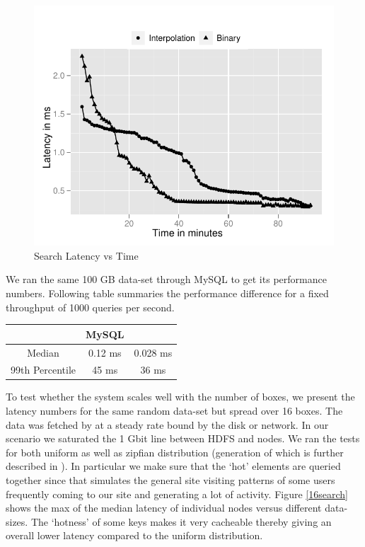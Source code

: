 \begin{figure}
  \centering
    \includegraphics[scale=0.55]{images/search_1node.pdf}
  \caption{Search Latency vs Time}
  \label{search}
\end{figure}

We ran the same 100 GB data-set through MySQL to get its performance numbers. Following table summaries the performance difference for a fixed throughput of 1000 queries per second. 

\begin{center}
    \begin{tabular}{ | c | c | c |  }
    \hline
     & MySQL & \projectname{} \\ \hline
    Median &   0.12 ms &  0.028	ms \\
	99th Percentile	& 45 ms & 36 ms \\
\hline
    \end{tabular}
\end{center}

To test whether the system scales well with the number of boxes, we present the latency numbers for the same random data-set but spread over 16 boxes. The data was fetched by \projectname{} at a steady rate bound by the disk or network. In our scenario we saturated the 1 Gbit line between HDFS and \projectname{} nodes. We ran the tests for both uniform as well as zipfian distribution (generation of which is further described in \cite{gray}). In particular we make sure that the `hot' elements are queried together since that simulates the general site visiting patterns of some users frequently coming to our site and generating a lot of activity. Figure \ref{16search} shows the max of the median latency of individual nodes versus different data-sizes. The `hotness' of some keys makes it very cacheable thereby giving an overall lower latency compared to the uniform distribution. 

